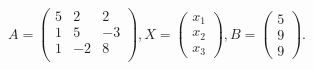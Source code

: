 \documentclass[12pt]{article}
\begin{document}
$ \begin{equation*}A=\begin{pmatrix}5 & 2 & 2 \\1 & 5 & -3 \\1 & -2 & 8 \\\end{pmatrix}, X=\begin{pmatrix}x_1 \\x_2 \\x_3\end{pmatrix}, B = \begin{pmatrix}5 \\9 \\9\end{pmatrix}.\end{equation*} $
\end{document}
